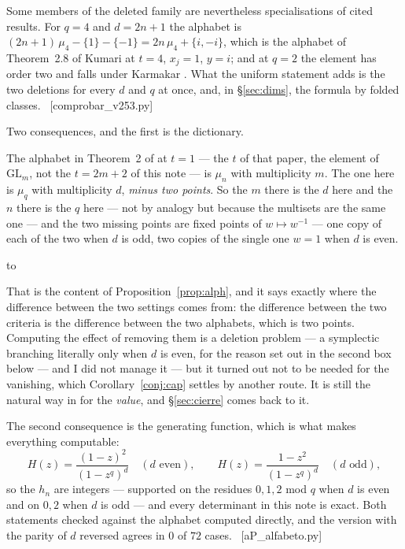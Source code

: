 \documentclass[11pt,a4paper]{article}
\theoremstyle{definition}
\newcommand{\GL}{\mathrm{GL}}
\newcommand{\ver}[1]{\unskip\penalty0\ \textcolor{azul}{\small\textsf{[#1]}}}
\newenvironment{keybox}
  {\par\vspace{9pt}\begin{lrbox}{\fichabox}%
   \begin{minipage}{0.90\textwidth}\vspace{7pt}\setlength{\parskip}{3pt}}
  {\vspace{7pt}\end{minipage}\end{lrbox}%
   \par\noindent\hbox to \textwidth{\hfill
   \textcolor{azul}{\rule[-\dp\fichabox]{3.2pt}{\dimexpr\ht\fichabox+\dp\fichabox\relax}}%
   \colorbox{fondoficha}{\usebox{\fichabox}}\hfill}%
   \par\vspace{9pt}}
\begin{document}
\noindent Some members of the deleted family are nevertheless specialisations of cited results.
For $q=4$ and $d=2n+1$ the alphabet is $(2n+1)\,\mu_4-\{1\}-\{-1\}=2n\,\mu_4+\{i,-i\}$, which is
the alphabet of Theorem~2.8 of Kumari \cite{Kum24} at $t=4$, $x_j=1$, $y=i$; and at $q=2$ the
element has order two and falls under Karmakar \cite{Kar24}. What the uniform statement adds is the
two deletions for every $d$ and $q$ at once, and, in \S\ref{sec:dims}, the formula by folded
classes. \ver{comprobar\_v253.py}

Two consequences, and the first is the dictionary.

\begin{keybox}
The alphabet in Theorem~2 of \cite{Prasad16b} at $t=1$ --- the $t$ of that paper, the element of
$\GL_m$, not the $t=2m+2$ of this note --- is $\mu_n$ with multiplicity $m$. The one here is $\mu_q$
with multiplicity $d$, \emph{minus two points}. So the $m$ there is the $d$ here and the $n$ there is
the $q$ here --- not by
analogy but because the multisets are the same one --- and the two missing points
are fixed points of $w\mapsto w^{-1}$ --- one copy of each of the two when $d$ is odd, two copies of
the single one $w=1$ when $d$ is even.
\end{keybox}

\noindent That is the content of Proposition~\ref{prop:alph}, and it says exactly where the
difference between the two settings comes from: the difference between the two criteria is the difference between the two
alphabets, which is two points. Computing the effect of removing them is a deletion problem --- a
symplectic branching literally only when $d$ is even, for the reason set out in the second box
below --- and I did not manage it --- but it turned out not to be needed for the vanishing, which Corollary~\ref{conj:cap}
settles by another route. It is still the natural way in for the \emph{value}, and \S\ref{sec:cierre}
comes back to it.

The second consequence is the generating function, which is what makes everything computable:
\[
H(z)=\frac{(1-z)^2}{(1-z^q)^d}\quad (d\text{ even}),
\qquad
H(z)=\frac{1-z^2}{(1-z^q)^d}\quad (d\text{ odd}),
\]
so the $h_n$ are integers --- supported on the residues $0,1,2$ mod $q$ when $d$ is even and on
$0,2$ when $d$ is odd --- and every determinant in this note is exact. Both statements checked
against the alphabet computed directly, and the version with the parity of $d$ reversed agrees in
$0$ of $72$ cases. \ver{aP\_alfabeto.py}
\end{document}
